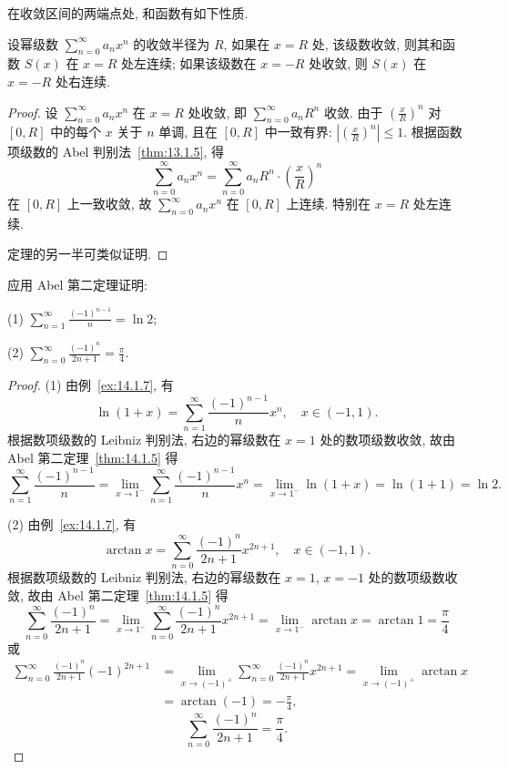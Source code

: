 在收敛区间的两端点处, 和函数有如下性质.



\begin{theorem}\label{thm:14.1.5}
设幂级数 $\sum_{n=0}^{\infty}a_{n}x^{n}$ 的收敛半径为 $R$, 如果在 $x=R$ 处, 该级数收敛, 则其和函数 $S(x)$ 在 $x=R$ 处左连续; 如果该级数在 $x=-R$ 处收敛, 则 $S(x)$ 在 $x=-R$ 处右连续.
\end{theorem}

\begin{proof}
设 $\sum_{n=0}^{\infty}a_{n}x^{n}$ 在 $x=R$ 处收敛, 即 $\sum_{n=0}^{\infty}a_{n}R^{n}$ 收敛. 由于 $\left(\frac{x}{R}\right)^{n}$ 对 $[0,R]$ 中的每个 $x$ 关于 $n$ 单调, 且在 $[0,R]$ 中一致有界: $\left|\left(\frac{x}{R}\right)^{n}\right|\leqslant1$. 根据函数项级数的 Abel 判别法~\ref{thm:13.1.5}, 得
\[
  \sum_{n=0}^{\infty}a_{n}x^{n}=\sum_{n=0}^{\infty}a_{n}R^{n}\cdot\left(\frac{x}{R}\right)^{n}
\]
在 $[0,R]$ 上一致收敛, 故 $\sum_{n=0}^{\infty}a_{n}x^{n}$ 在 $[0,R]$ 上连续. 特别在 $x=R$ 处左连续.

定理的另一半可类似证明.
\end{proof}

\begin{example}\label{ex:14.1.8}
应用 Abel 第二定理证明:

(1) $\sum_{n=1}^{\infty}\frac{(-1)^{n-1}}{n}=\ln2$;

(2) $\sum_{n=0}^{\infty}\frac{(-1)^{n}}{2n+1}=\frac{\pi}{4}$.
\end{example}

\begin{proof}
(1) 由例~\ref{ex:14.1.7}, 有
\[
  \ln(1+x)=\sum_{n=1}^{\infty}\frac{(-1)^{n-1}}{n}x^{n},\quad x\in(-1,1).
\]
根据数项级数的 Leibniz 判别法, 右边的幂级数在 $x=1$ 处的数项级数收敛, 故由 Abel 第二定理~\ref{thm:14.1.5} 得
\[
  \sum_{n=1}^{\infty}\frac{(-1)^{n-1}}{n}=\lim_{x\to1^{-}}\sum_{n=1}^{\infty}\frac{(-1)^{n-1}}{n}x^{n}=\lim_{x\to1^{-}}\ln(1+x)=\ln(1+1)=\ln2.
\]

(2) 由例~\ref{ex:14.1.7}, 有
\[
  \arctan x=\sum_{n=0}^{\infty}\frac{(-1)^{n}}{2n+1}x^{2n+1},\quad x\in(-1,1).
\]
根据数项级数的 Leibniz 判别法, 右边的幂级数在 $x=1$, $x=-1$ 处的数项级数收敛, 故由 Abel 第二定理~\ref{thm:14.1.5} 得
\[
  \sum_{n=0}^{\infty}\frac{(-1)^{n}}{2n+1}=\lim_{x\to1^{-}}\sum_{n=0}^{\infty}\frac{(-1)^{n}}{2n+1}x^{2n+1}=\lim_{x\to1^{-}}\arctan x=\arctan1=\frac{\pi}{4}
\]
或
\[
  \begin{aligned}
    \sum_{n=0}^{\infty}\frac{(-1)^{n}}{2n+1}(-1)^{2n+1}&=\lim_{x\to(-1)^{+}}\sum_{n=0}^{\infty}\frac{(-1)^{n}}{2n+1}x^{2n+1}=\lim_{x\to(-1)^{+}}\arctan x\\
    &=\arctan(-1)=-\frac{\pi}{4},
  \end{aligned}
\]
\[
  \sum_{n=0}^{\infty}\frac{(-1)^{n}}{2n+1}=\frac{\pi}{4}.
\]
\end{proof}


